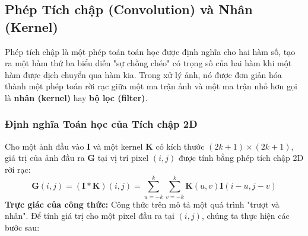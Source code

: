 \subsection{Phép Tích chập (Convolution) và Nhân (Kernel)}
\label{subsec:convolution_and_kernel}

Phép tích chập là một phép toán toán học được định nghĩa cho hai hàm số, tạo ra một hàm thứ ba biểu diễn "sự chồng chéo" có trọng số của hai hàm khi một hàm được dịch chuyển qua hàm kia. Trong xử lý ảnh, nó được đơn giản hóa thành một phép toán rời rạc giữa một ma trận ảnh và một ma trận nhỏ hơn gọi là \textbf{nhân (kernel)} hay \textbf{bộ lọc (filter)}.

\subsubsection{Định nghĩa Toán học của Tích chập 2D}
\label{subsubsec:convolution_definition}
Cho một ảnh đầu vào $\mathbf{I}$ và một kernel $\mathbf{K}$ có kích thước $(2k+1) \times (2k+1)$, giá trị của ảnh đầu ra $\mathbf{G}$ tại vị trí pixel $(i, j)$ được tính bằng phép tích chập 2D rời rạc:
\begin{equation}
    \mathbf{G}(i, j) = (\mathbf{I} * \mathbf{K})(i, j) = \sum_{u=-k}^{k} \sum_{v=-k}^{k} \mathbf{K}(u, v) \mathbf{I}(i-u, j-v)
    \label{eq:convolution}
\end{equation}
\textbf{Trực giác của công thức:}
Công thức trên mô tả một quá trình "trượt và nhân". Để tính giá trị cho một pixel đầu ra tại $(i,j)$, chúng ta thực hiện các bước sau:
